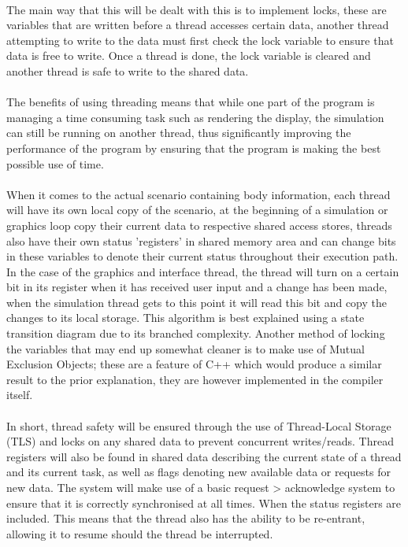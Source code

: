 \paragraph{}
The main way that this will be dealt with this is to implement locks, these are variables that are written before a thread accesses certain data, another thread attempting to write to the data must first check the lock variable to ensure that data is free to write. Once a thread is done, the lock variable is cleared and another thread is safe to write to the shared data.

\paragraph{}
The benefits of using threading means that while one part of the program is managing a time consuming task such as rendering the display, the simulation can still be running on another thread, thus significantly improving the performance of the program by ensuring that the program is making the best possible use of time.

\paragraph{}
When it comes to the actual scenario containing body information, each thread will have its own local copy of the scenario, at the beginning of a simulation or graphics loop copy their current data to respective shared access stores, threads also have their own status 'registers' in shared memory area and can change bits in these variables to denote their current status throughout their execution path. In the case of the graphics and interface thread, the thread will turn on a certain bit in its register when it has received user input and a change has been made, when the simulation thread gets to this point it will read this bit and copy the changes to its local storage. This algorithm is best explained using a state transition diagram due to its branched complexity. Another method of locking the variables that may end up somewhat cleaner is to make use of Mutual Exclusion Objects; these are a feature of C++ which would produce a similar result to the prior explanation, they are however implemented in the compiler itself.

\paragraph{}
In short, thread safety will be ensured through the use of Thread-Local Storage (TLS) and locks on any shared data to prevent concurrent writes/reads. Thread registers will also be found in shared data describing the current state of a thread and its current task, as well as flags denoting new available data or requests for new data. The system will make use of a basic request > acknowledge system to ensure that it is correctly synchronised at all times. When the status registers are included. This means that the thread also has the ability to be re-entrant, allowing it to resume should the thread be interrupted.

